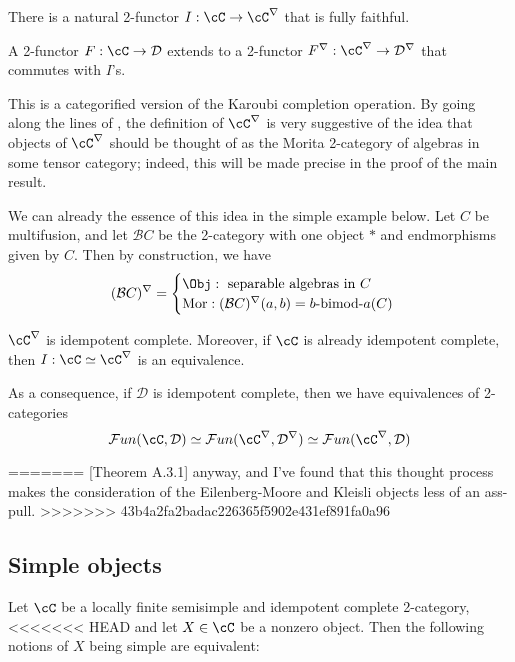 \documentclass[12pt]{article}
\newcommand{\cB}{{\mathcal{B}}}
\newcommand{\cD}{{\mathcal{D}}}
\newcommand{\cFun}{{\mathcal{F}un}}
\begin{document}
\begin{proposition}
\begin{definition}
There is a natural 2-functor $I: \cC \to \cC^\nabla$
that is fully faithful.

A 2-functor $F: \cC \to \cD$
extends to a 2-functor $F^\nabla: \cC^\nabla \to \cD^\nabla$
that commutes with $I$'s.
\end{definition}

This is a categorified version of the Karoubi completion
operation.
By going along the lines of \cite{Ostrik},
the definition of $\cC^\nabla$
is very suggestive of the idea that
objects of $\cC^\nabla$ should be thought of as
the Morita 2-category of algebras in some tensor category;
indeed, this will be made precise in the proof
of the main result.


We can already the essence of this idea in the simple
example below.
Let $C$ be multifusion,
and let $\cB C$ be the 2-category with one object $*$
and endmorphisms given by $C$.
Then by construction, we have
\[
(\cB C)^\nabla =
\begin{cases}
	\Obj: \text{ separable algebras in } C
	\\
	\text{Mor}: (\cB C)^\nabla (a,b) = b\text{-bimod-}a(C)
\end{cases}
\]



\begin{proposition}
$\cC^\nabla$ is idempotent complete.
Moreover, if $\cC$ is already idempotent complete,
then $I: \cC \simeq \cC^\nabla$ is an equivalence.
\end{proposition}

As a consequence, if $\cD$ is idempotent complete,
then we have equivalences of 2-categories
\[
\cFun(\cC,\cD) \simeq \cFun(\cC^\nabla,\cD^\nabla)
\simeq \cFun(\cC^\nabla, \cD)
\]

=======
\cite{DRfusion}[Theorem A.3.1] anyway,
and I've found that this thought process
makes the consideration of the Eilenberg-Moore and Kleisli
objects less of an ass-pull.
>>>>>>> 43b4a2fa2badac226365f5902e431ef891fa0a96


\subsection{Simple objects}


\begin{proposition}
Let $\cC$ be a locally finite semisimple and
idempotent complete 2-category,
<<<<<<< HEAD
and let $X \in \cC$ be a nonzero object.
Then the following notions of $X$ being simple are equivalent:


\end{proposition}
\end{proposition}
\end{document}
